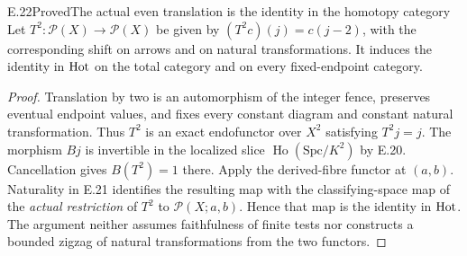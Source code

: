 \begin{claim}{E.22}{Proved}{The actual even translation is the identity in the homotopy category}
Let $T^2:\mathcal P(X)\to\mathcal P(X)$ be given by $(T^2c)(j)=c(j-2)$, with the corresponding shift on arrows and on natural transformations. It induces the identity in $\mathrm{Hot}$ on the total category and on every fixed-endpoint category.
\end{claim}
\begin{proof}
Translation by two is an automorphism of the integer fence, preserves eventual endpoint values, and fixes every constant diagram and constant natural transformation. Thus $T^2$ is an exact endofunctor over $X^2$ satisfying $T^2j=j$. The morphism $Bj$ is invertible in the localized slice $\operatorname{Ho}(\mathrm{Spc}/K^2)$ by E.20. Cancellation gives $B(T^2)=1$ there. Apply the derived-fibre functor at $(a,b)$. Naturality in E.21 identifies the resulting map with the classifying-space map of the \emph{actual restriction} of $T^2$ to $\mathcal P(X;a,b)$. Hence that map is the identity in $\mathrm{Hot}$. The argument neither assumes faithfulness of finite tests nor constructs a bounded zigzag of natural transformations from the two functors.
\end{proof}

